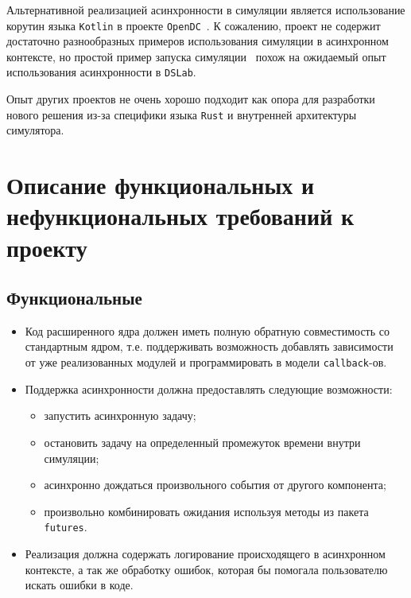 Альтернативной реализацией асинхронности в симуляции является использование корутин языка \texttt{Kotlin} в проекте \texttt{OpenDC}~\cite{opendc-repo}\cite{opendc-article}. К сожалению, проект не содержит достаточно разнообразных примеров использования симуляции в асинхронном контексте, но простой пример запуска симуляции~\cite{opendc-example} похож на ожидаемый опыт использования асинхронности в \texttt{DSLab}.


Опыт других проектов не очень хорошо подходит как опора для разработки нового решения из-за специфики языка \texttt{Rust} и внутренней архитектуры симулятора.

\section{Описание функциональных и нефункциональных требований к проекту}\label{requirements}

\subsection{Функциональные}
\begin{itemize}
    \item Код расширенного ядра должен иметь полную обратную совместимость со стандартным ядром, т.е. поддерживать возможность добавлять зависимости от уже реализованных модулей и программировать в модели \texttt{callback}-ов.
    \item Поддержка асинхронности должна предоставлять следующие возможности:
    \begin{itemize}
        \item запустить асинхронную задачу;
        \item остановить задачу на определенный промежуток времени внутри симуляции;
        \item асинхронно дождаться произвольного события от другого компонента;
        \item произвольно комбинировать ожидания используя методы из пакета \texttt{futures}\cite{rust-futures}.
    \end{itemize}
    \item Реализация должна содержать логирование происходящего в асинхронном контексте, а так же обработку ошибок, которая бы помогала пользователю искать ошибки в коде. 
\end{itemize}

